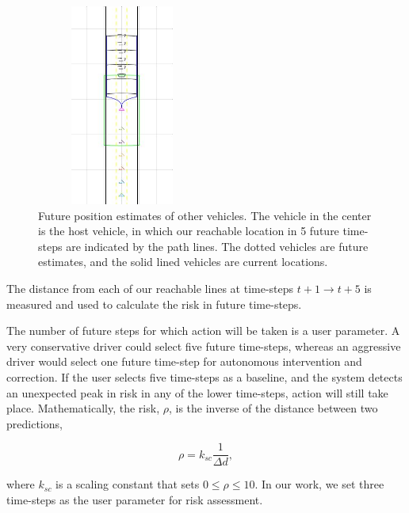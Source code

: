 \documentclass[conference]{IEEEtran}
\begin{document}
\begin{figure}[ht]
    \includegraphics[height = 250,width=0.5\textwidth]{lanesandrisk.JPG}
    \caption{Future position estimates of other vehicles. The vehicle in the center is the host vehicle, in which our reachable location in 5 future time-steps are indicated by the path lines. The dotted vehicles are future estimates, and the solid lined vehicles are current locations.}
    \label{fig:riskway}
\end{figure}
The distance from each of our reachable lines at time-steps $t+1 \to t+5$ is measured and used to calculate the risk in future time-steps.

The number of future steps for which action will be taken is a user parameter. A very conservative driver could select five future time-steps, whereas an aggressive driver would select one future time-step for autonomous intervention and correction. If the user selects five time-steps as a baseline, and the system detects an unexpected peak in risk in any of the lower time-steps, action will still take place. Mathematically, the risk, $\rho$, is the inverse of the distance between two predictions,

\begin{equation}
\rho = k_{sc}\frac{1}{\Delta d},
\end{equation}

where $k_{sc}$ is a scaling constant that sets $0 \leq \rho \leq 10$. In our work, we set three time-steps as the user parameter for risk assessment.
\end{document}
